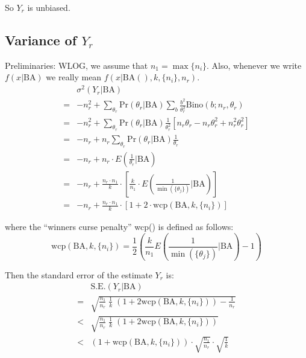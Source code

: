 \documentclass{sig-alternate}
\begin{document}
So $Y_r$ is unbiased.

\newpage

\subsection{Variance of $Y_r$}

Preliminaries: WLOG, we assume that $n_1 = \max \{n_i\}$. Also, whenever we write
$f(x|\mathrm{BA})$ we really mean $f(x|\mathrm{BA}(),k,\{n_i\},n_r)$.
\begin{align}
   & \sigma^2(Y_r|\mathrm{BA}) \\
 = & -n_r^2 + \sum_{\theta_r} \mathrm{Pr}(\theta_r|\mathrm{BA}) \sum_b \frac{b^2}{\theta_r^2} \mathrm{Bino}(b;n_r,\theta_r) \\
 = & -n_r^2 + \sum_{\theta_r} \mathrm{Pr}(\theta_r|\mathrm{BA}) \frac{1}{\theta_r^2} [n_r\theta_r - n_r\theta_r^2 + n_r^2\theta_r^2] \\
 = & -n_r + n_r \sum_{\theta_r} \mathrm{Pr}(\theta_r|\mathrm{BA}) \frac{1}{\theta_r} \\
 = & -n_r + n_r \cdot E(\frac{1}{\theta_r}|\mathrm{BA}) \\
 = & -n_r + \frac{n_r \cdot n_1}{k} \cdot \left[ \frac{k}{n_1} \cdot E\left( \frac{1}{\min(\{\theta_j\})} | \mathrm{BA} \right) \right] \\
 = & -n_r + \frac{n_r \cdot n_1}{k} \cdot \left[ 1 + 2 \cdot \mathrm{wcp}(\mathrm{BA},k,\{n_i\}) \right]
\end{align}

\noindent where the ``winners curse penalty'' wcp() is defined as follows:
\begin{equation}
\mathrm{wcp}(\mathrm{BA},k,\{n_i\}) = \frac{1}{2}\left(\frac{k}{n_1} E\left( \frac{1}{\min(\{\theta_j\})} | \mathrm{BA} \right) - 1 \right)
\end{equation}

\noindent Then the standard error of the estimate $Y_r$ is:
\begin{align}
   & \mathrm{S.E.}(Y_r|\mathrm{BA}) \\
 = & \sqrt{\frac{n_1}{n_r} \; \frac{1}{k} \; (1 + 2 \mathrm{wcp}(\mathrm{BA},k,\{n_i\})) - \frac{1}{n_r}} \\
 < & \sqrt{\frac{n_1}{n_r} \; \frac{1}{k} \; (1 + 2 \mathrm{wcp}(\mathrm{BA},k,\{n_i\}))} \\
 < & (1 + \mathrm{wcp}(\mathrm{BA},k,\{n_i\})) \cdot \sqrt{\frac{n_1}{n_r}} \cdot \sqrt{\frac{1}{k}} 
\end{align}
\end{document}
